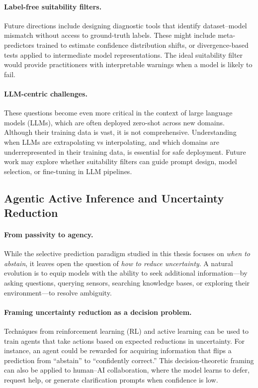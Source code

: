 \paragraph{Label-free suitability filters.} Future directions include designing diagnostic tools that identify dataset–model mismatch without access to ground-truth labels. These might include meta-predictors trained to estimate confidence distribution shifts, or divergence-based tests applied to intermediate model representations. The ideal suitability filter would provide practitioners with interpretable warnings when a model is likely to fail.

\paragraph{LLM-centric challenges.} These questions become even more critical in the context of large language models (LLMs), which are often deployed zero-shot across new domains. Although their training data is vast, it is not comprehensive. Understanding when LLMs are extrapolating vs interpolating, and which domains are underrepresented in their training data, is essential for safe deployment. Future work may explore whether suitability filters can guide prompt design, model selection, or fine-tuning in LLM pipelines.

\subsection{Agentic Active Inference and Uncertainty Reduction}

\paragraph{From passivity to agency.} While the selective prediction paradigm studied in this thesis focuses on \emph{when to abstain}, it leaves open the question of \emph{how to reduce uncertainty}. A natural evolution is to equip models with the ability to seek additional information—by asking questions, querying sensors, searching knowledge bases, or exploring their environment—to resolve ambiguity.

\paragraph{Framing uncertainty reduction as a decision problem.} Techniques from reinforcement learning (RL) and active learning can be used to train agents that take actions based on expected reductions in uncertainty. For instance, an agent could be rewarded for acquiring information that flips a prediction from “abstain” to “confidently correct.” This decision-theoretic framing can also be applied to human–AI collaboration, where the model learns to defer, request help, or generate clarification prompts when confidence is low.

